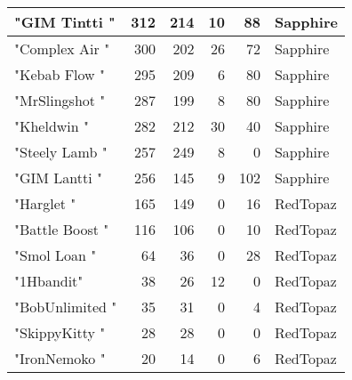 \documentclass{article}
\begin{document}
\begin{table}[htbp]
\begin{tabular}{|l|r|r|r|r|l|}
"GIM Tintti " & 312 & 214 & 10 & 88 & Sapphire \\ \hline
"Complex Air " & 300 & 202 & 26 & 72 & Sapphire \\ \hline
"Kebab Flow " & 295 & 209 & 6 & 80 & Sapphire \\ \hline
"MrSlingshot " & 287 & 199 & 8 & 80 & Sapphire \\ \hline
"Kheldwin " & 282 & 212 & 30 & 40 & Sapphire \\ \hline
"Steely Lamb " & 257 & 249 & 8 & 0 & Sapphire \\ \hline
"GIM Lantti " & 256 & 145 & 9 & 102 & Sapphire \\ \hline
"Harglet " & 165 & 149 & 0 & 16 & RedTopaz \\ \hline
"Battle Boost " & 116 & 106 & 0 & 10 & RedTopaz \\ \hline
"Smol Loan " & 64 & 36 & 0 & 28 & RedTopaz \\ \hline
"1Hbandit" & 38 & 26 & 12 & 0 & RedTopaz \\ \hline
"BobUnlimited " & 35 & 31 & 0 & 4 & RedTopaz \\ \hline
"SkippyKitty " & 28 & 28 & 0 & 0 & RedTopaz \\ \hline
"IronNemoko " & 20 & 14 & 0 & 6 & RedTopaz \\ \hline
\end{tabular}
\end{table}
\end{document}
